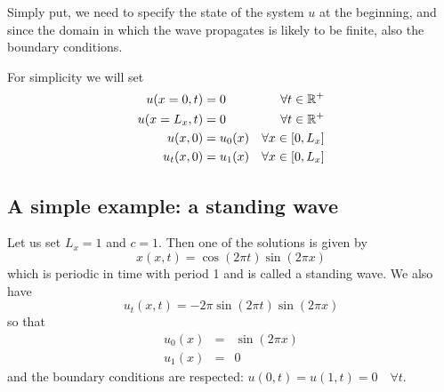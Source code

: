 Simply put, we need to specify the state of the system $u$ at the beginning, 
and since the domain in which the wave propagates is likely to be finite, 
also the boundary conditions.

For simplicity we will set
\begin{align}
u(x=0,t) & = 0 & \forall t\in {\mathbb{R}}^+ \\
u(x=L_x,t) & = 0 & \forall t\in {\mathbb{R}}^+ \\
u(x,0) &= u_0(x) & \forall x\in[0,L_x]\\
u_t(x,0) &= u_1(x) & \forall x\in[0,L_x]
\end{align}

\subsection{A simple example: a standing wave \label{ss:sw1d}}

Let us set $L_x=1$ and $c=1$. Then one of the solutions is 
given by 
\[
x(x,t)=\cos(2\pi t) \sin(2\pi x)
\]
which is periodic in time with period 1 and is called a standing wave.
We also have
\[
u_t(x,t)=-2 \pi \sin (2\pi t) \sin(2\pi x)
\]
so that 
\begin{eqnarray}
u_0(x) &=& \sin(2\pi x) \\
u_1(x) &=& 0 
\end{eqnarray}
and the boundary conditions are respected: $u(0,t)=u(1,t)=0 \quad \forall t$.

